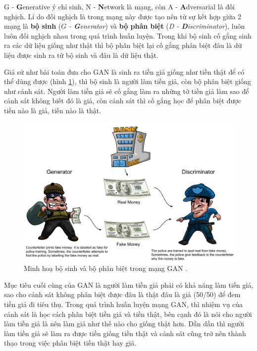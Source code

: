 \documentclass[a4paper, 12pt]{report}
\begin{document}
G - \textbf{G}enerative ý chỉ sinh, N - \textbf{N}etwork là mạng, còn A - \textbf{A}dversarial là đối nghịch.
Lí do đối nghịch là trong mạng này được tạo nên từ sự kết hợp giữa 2 mạng là \textbf{bộ sinh} ($G$ \textit{- \textbf{G}enerator}) và \textbf{bộ phân biệt} (\textit{D - \textbf{D}iscriminator}), luôn luôn đối nghịch nhau trong quá trình huấn luyện.
Trong khi bộ sinh cố gắng sinh ra các dữ liệu giống như thật thì bộ phân biệt lại cố gắng phân biệt đâu là dữ liệu được sinh ra từ bộ sinh và đâu là dữ liệu thật.\vspace{5pt}

Giả sử như bài toán đưa cho GAN là sinh ra tiền giả giống như tiền thật để có thể dùng được (hình \ref{fig:thiefandpolice}), thì bộ sinh là người làm tiền giả, còn bộ phân biệt giống như cảnh sát.
Người làm tiền giả sẽ cố gắng làm ra những tờ tiền giả làm sao để cảnh sát không biết đó là giả, còn cảnh sát thì cố gắng học để phân biệt được tiền nào là giả, tiền nào là thật.

\begin{figure}[!h]
\captionsetup{width=0.8\textwidth}
\centering
\includegraphics[width=15cm]{images/2_7.png}
\caption{Minh hoạ bộ sinh và bộ phân biệt trong mạng GAN \cite{richardgan2018}.}
\label{fig:thiefandpolice}
\end{figure}

Mục tiêu cuối cùng của GAN là người làm tiền giả phải có khả năng làm tiền giả, sao cho cảnh sát không phân biệt được đâu là thật đâu là giả (50/50) để đem tiền giả đi tiêu thụ.
Trong quá trình huấn luyện mạng GAN, thì nhiệm vụ của cảnh sát là học cách phân biệt tiền giả và tiền thật, bên cạnh đó là nói cho người làm tiền giả là nên làm giả như thế nào cho giống thật hơn.
Dần dần thì người làm tiền giả sẽ làm ra được tiền giống tiền thật và cảnh sát cũng trở nên thành thạo trong việc phân biệt tiền thật hay giả.
\end{document}
